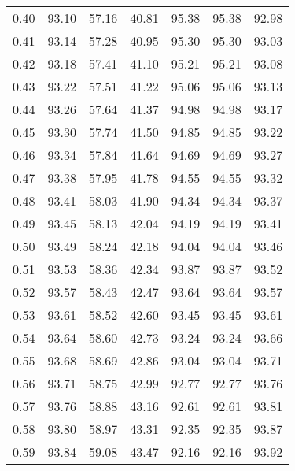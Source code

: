 \begin{tabular}{|c|c|c|c|c|c|c|}
      0.40 &     93.10 &     57.16 &      40.81 &   95.38 &      95.38 &         92.98 \\
      0.41 &     93.14 &     57.28 &      40.95 &   95.30 &      95.30 &         93.03 \\
      0.42 &     93.18 &     57.41 &      41.10 &   95.21 &      95.21 &         93.08 \\
      0.43 &     93.22 &     57.51 &      41.22 &   95.06 &      95.06 &         93.13 \\
      0.44 &     93.26 &     57.64 &      41.37 &   94.98 &      94.98 &         93.17 \\
      0.45 &     93.30 &     57.74 &      41.50 &   94.85 &      94.85 &         93.22 \\
      0.46 &     93.34 &     57.84 &      41.64 &   94.69 &      94.69 &         93.27 \\
      0.47 &     93.38 &     57.95 &      41.78 &   94.55 &      94.55 &         93.32 \\
      0.48 &     93.41 &     58.03 &      41.90 &   94.34 &      94.34 &         93.37 \\
      0.49 &     93.45 &     58.13 &      42.04 &   94.19 &      94.19 &         93.41 \\
      0.50 &     93.49 &     58.24 &      42.18 &   94.04 &      94.04 &         93.46 \\
      0.51 &     93.53 &     58.36 &      42.34 &   93.87 &      93.87 &         93.52 \\
      0.52 &     93.57 &     58.43 &      42.47 &   93.64 &      93.64 &         93.57 \\
      0.53 &     93.61 &     58.52 &      42.60 &   93.45 &      93.45 &         93.61 \\
      0.54 &     93.64 &     58.60 &      42.73 &   93.24 &      93.24 &         93.66 \\
      0.55 &     93.68 &     58.69 &      42.86 &   93.04 &      93.04 &         93.71 \\
      0.56 &     93.71 &     58.75 &      42.99 &   92.77 &      92.77 &         93.76 \\
      0.57 &     93.76 &     58.88 &      43.16 &   92.61 &      92.61 &         93.81 \\
      0.58 &     93.80 &     58.97 &      43.31 &   92.35 &      92.35 &         93.87 \\
      0.59 &     93.84 &     59.08 &      43.47 &   92.16 &      92.16 &         93.92 \\

\end{tabular}
